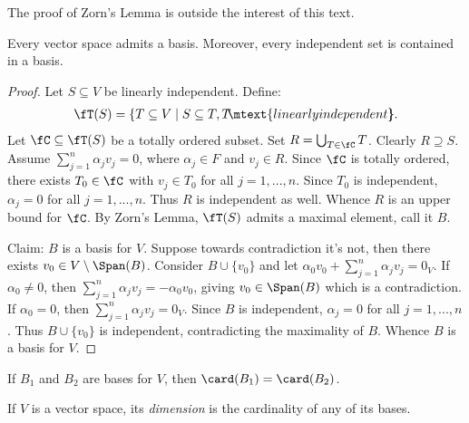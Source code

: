     The proof of Zorn's Lemma is outside the interest of this text. 

    \begin{theorem}
        Every vector space admits a basis. Moreover, every independent set is contained in a basis.
    \end{theorem}
        \begin{proof}
            Let $S \subseteq V$ be linearly independent. Define:
                \begin{equation*}
                \begin{split}
                    \fT(S) = \{T \subseteq V \mid S \subseteq T, T \hspace{-3pt}\mtext{linearly independent}\hspace{-5pt}\}.
                \end{split}
                \end{equation*}
            Let $\fC \subseteq \fT(S)$ be a totally ordered subset. Set $R = \bigcup_{T \in \fC} T$. Clearly $R \supseteq S$. Assume $\sum_{j = 1}^n \alpha_j v_j = 0$, where $\alpha_j \in F$ and $v_j \in R$. Since $\fC$ is totally ordered, there exists $T_0 \in \fC$ with $v_j \in T_0$ for all $j = 1,...,n$. Since $T_0$ is independent, $\alpha_j = 0$ for all $j = 1,...,n$. Thus $R$ is independent as well. Whence $R$ is an upper bound for $\fC$. By Zorn's Lemma, $\fT(S)$ admits a maximal element, call it $B$.

            Claim: $B$ is a basis for $V$. Suppose towards contradiction it's not, then there exists $v_0 \in V \setminus \Span(B)$. Consider $B \cup \{v_0\}$ and let $\alpha_0 v_0 + \sum_{j = 1}^n \alpha_j v_j = 0_V$. If $\alpha_0 \neq 0$, then $\sum_{j = 1}^n \alpha_j v_j = -\alpha_0 v_0 $, giving $v_0 \in \Span(B)$ which is a contradiction. If $\alpha_0 = 0$, then $\sum_{j = 1}^n \alpha_j v_j = 0_V$. Since $B$ is independent, $\alpha_j = 0$ for all $j =1,...,n$. Thus $B \cup \{v_0\}$ is independent, contradicting the maximality of $B$. Whence $B$ is a basis for $V$.
        \end{proof}

    \begin{theorem}
        If $B_1$ and $B_2$ are bases for $V$, then $\card(B_1) = \card(B_2)$.
    \end{theorem}

    \begin{definition}
        If $V$ is a vector space, its \textit{dimension} is the cardinality of any of its bases.
    \end{definition}

